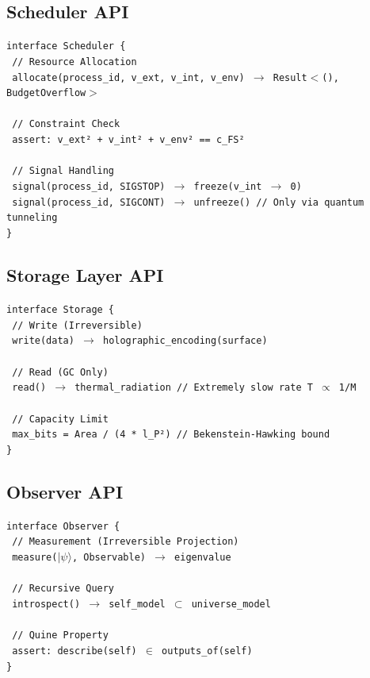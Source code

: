 \subsection{Scheduler API}

\texttt{interface Scheduler \{} \\
\texttt{  // Resource Allocation} \\
\texttt{  allocate(process\_id, v\_ext, v\_int, v\_env) $\to$ Result$<$(), BudgetOverflow$>$} \\
\texttt{  } \\
\texttt{  // Constraint Check} \\
\texttt{  assert: v\_ext² + v\_int² + v\_env² == c\_FS²} \\
\texttt{  } \\
\texttt{  // Signal Handling} \\
\texttt{  signal(process\_id, SIGSTOP) $\to$ freeze(v\_int $\to$ 0)} \\
\texttt{  signal(process\_id, SIGCONT) $\to$ unfreeze()  // Only via quantum tunneling} \\
\texttt{\}}

\subsection{Storage Layer API}

\texttt{interface Storage \{} \\
\texttt{  // Write (Irreversible)} \\
\texttt{  write(data) $\to$ holographic\_encoding(surface)} \\
\texttt{  } \\
\texttt{  // Read (GC Only)} \\
\texttt{  read() $\to$ thermal\_radiation  // Extremely slow rate T $\propto$ 1/M} \\
\texttt{  } \\
\texttt{  // Capacity Limit} \\
\texttt{  max\_bits = Area / (4 * l\_P²)  // Bekenstein-Hawking bound} \\
\texttt{\}}

\subsection{Observer API}

\texttt{interface Observer \{} \\
\texttt{  // Measurement (Irreversible Projection)} \\
\texttt{  measure($|\psi\rangle$, Observable) $\to$ eigenvalue} \\
\texttt{  } \\
\texttt{  // Recursive Query} \\
\texttt{  introspect() $\to$ self\_model $\subset$ universe\_model} \\
\texttt{  } \\
\texttt{  // Quine Property} \\
\texttt{  assert: describe(self) $\in$ outputs\_of(self)} \\
\texttt{\}}

